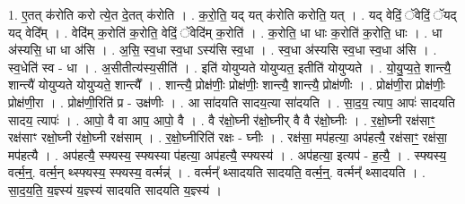\documentclass[17pt]{extarticle}
\begin{document}
1. ए॒तत् क॑रोति करो त्ये॒त दे॒तत् क॑रोति । . क॒रो॒ति॒ यद् यत् क॑रोति करोति॒ यत् । . यद् वेदिं॒ ॅवेदिं॒ ॅयद् यद् वेदि᳚म् । . वेदि॑म् क॒रोति॑ क॒रोति॒ वेदिं॒ ॅवेदि॑म् क॒रोति॑ । . क॒रोति॒ धा धाः क॒रोति॑ क॒रोति॒ धाः । . धा अ॑स्यसि॒ धा धा अ॑सि । . अ॒सि॒ स्व॒धा स्व॒धा ऽस्य॑सि स्व॒धा । . स्व॒धा अ॑स्यसि स्व॒धा स्व॒धा अ॑सि । . स्व॒धेति॑ स्व - धा । . अ॒सीतीत्य॑स्य॒सीति॑ । . इति॑ योयुप्यते योयुप्यत॒ इतीति॑ योयुप्यते । . यो॒यु॒प्य॒ते॒ शान्त्यै॒ शान्त्यै॑ योयुप्यते योयुप्यते॒ शान्त्यै᳚ । . शान्त्यै॒ प्रोक्ष॑णीः॒ प्रोक्ष॑णीः॒ शान्त्यै॒ शान्त्यै॒ प्रोक्ष॑णीः । . प्रोक्ष॑णी॒रा प्रोक्ष॑णीः॒ प्रोक्ष॑णी॒रा । . प्रोक्ष॑णी॒रिति॑ प्र - उक्ष॑णीः । . आ सा॑दयति सादय॒त्या सा॑दयति । . सा॒द॒य॒ त्याप॒ आपः॑ सादयति सादय॒ त्यापः॑ । . आपो॒ वै वा आप॒ आपो॒ वै । . वै र॑क्षो॒घ्नी र॑क्षो॒घ्नीर् वै वै र॑क्षो॒घ्नीः । . र॒क्षो॒घ्नी रक्ष॑साꣳ॒॒ रक्ष॑साꣳ रक्षो॒घ्नी र॑क्षो॒घ्नी रक्ष॑साम् । . र॒क्षो॒घ्नीरिति॑ रक्षः - घ्नीः । . रक्ष॑सा॒ मप॑हत्या॒ अप॑हत्यै॒ रक्ष॑साꣳ॒॒ रक्ष॑सा॒ मप॑हत्यै । . अप॑हत्यै॒ स्फ्यस्य॒ स्फ्यस्या प॑हत्या॒ अप॑हत्यै॒ स्फ्यस्य॑ । . अप॑हत्या॒ इत्यप॑ - ह॒त्यै॒ । . स्फ्यस्य॒ वर्त्म॒न्॒. वर्त्म॒न् थ्स्फ्यस्य॒ स्फ्यस्य॒ वर्त्मन्न्॑ । . वर्त्मन्᳚ थ्सादयति सादयति॒ वर्त्म॒न्॒. वर्त्मन्᳚ थ्सादयति । . सा॒द॒य॒ति॒ य॒ज्ञ्स्य॑ य॒ज्ञ्स्य॑ सादयति सादयति य॒ज्ञ्स्य॑ । \newline
\end{document}
